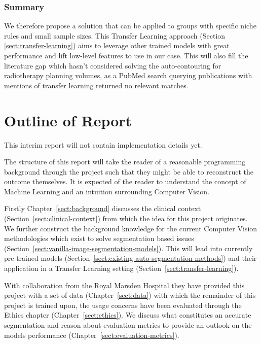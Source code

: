 \documentclass[11pt,twoside]{report}
\begin{document}
\subsubsection{Summary}

We therefore propose a solution that can be applied to groups with specific niche rules and small sample sizes. This Transfer Learning approach (Section \ref{sect:transfer-learning}) aims to leverage other trained models with great performance and lift low-level features to use in our case. This will also fill the literature gap which hasn't considered solving the auto-contouring for radiotherapy planning volumes, as a PubMed search querying publications with mentions of transfer learning returned no relevant matches.

\section{Outline of Report}\label{sect:outline-of-report}

\begin{warning}
  This interim report will not contain implementation details yet.
\end{warning}

The structure of this report will take the reader of a reasonable programming background through the project such that they might be able to reconstruct the outcome themselves. It is expected of the reader to understand the concept of Machine Learning and an intuition surrounding Computer Vision.

Firstly Chapter~\ref{sect:background} discusses the clinical context (Section~\ref{sect:clinical-context}) from which the idea for this project originates. We further construct the background knowledge for the current Computer Vision methodologies which exist to solve segmentation based issues (Section~\ref{sect:vanilla-image-segmentation-models}). This will lead into currently pre-trained models (Section~\ref{sect:existing-auto-segmentation-methods}) and their application in a Transfer Learning setting (Section~\ref{sect:transfer-learning}).

With collaboration from the Royal Marsden Hospital they have provided this project with a set of data (Chapter~\ref{sect:data}) with which the remainder of this project is trained upon, the usage concerns have been evaluated through the Ethics chapter (Chapter~\ref{sect:ethics}). We discuss what constitutes an accurate segmentation and reason about evaluation metrics to provide an outlook on the models performance (Chapter~\ref{sect:evaluation-metrics}).
\end{document}
